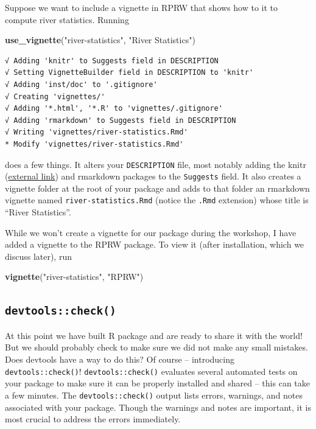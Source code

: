\documentclass[
]{book}
\newenvironment{Shaded}{\begin{snugshade}}{\end{snugshade}}
\newcommand{\KeywordTok}[1]{\textcolor[rgb]{0.13,0.29,0.53}{\textbf{#1}}}
\newcommand{\NormalTok}[1]{#1}
\newcommand{\StringTok}[1]{\textcolor[rgb]{0.31,0.60,0.02}{#1}}
\begin{document}
Suppose we want to include a vignette in RPRW that shows how to it to compute river statistics. Running

\begin{Shaded}
\begin{Highlighting}[]
\KeywordTok{use_vignette}\NormalTok{(}\StringTok{"river-statistics"}\NormalTok{, }\StringTok{"River Statistics"}\NormalTok{)}
\end{Highlighting}
\end{Shaded}

\begin{verbatim}
√ Adding 'knitr' to Suggests field in DESCRIPTION
√ Setting VignetteBuilder field in DESCRIPTION to 'knitr'
√ Adding 'inst/doc' to '.gitignore'
√ Creating 'vignettes/'
√ Adding '*.html', '*.R' to 'vignettes/.gitignore'
√ Adding 'rmarkdown' to Suggests field in DESCRIPTION
√ Writing 'vignettes/river-statistics.Rmd'
* Modify 'vignettes/river-statistics.Rmd'
\end{verbatim}

does a few things. It alters your \texttt{DESCRIPTION} file, most notably adding the knitr (\href{https://yihui.org/knitr/}{external link}) and rmarkdown packages to the \texttt{Suggests} field. It also creates a vignette folder at the root of your package and adds to that folder an rmarkdown vignette named \texttt{river-statistics.Rmd} (notice the \texttt{.Rmd} extension) whose title is ``River Statistics''.

While we won't create a vignette for our package during the workshop, I have added a vignette to the RPRW package. To view it (after installation, which we discuss later), run

\begin{Shaded}
\begin{Highlighting}[]
\KeywordTok{vignette}\NormalTok{(}\StringTok{"river-statistics"}\NormalTok{, }\StringTok{"RPRW"}\NormalTok{)}
\end{Highlighting}
\end{Shaded}

\hypertarget{check}{%
\subsection{\texorpdfstring{\texttt{devtools::check()}}{devtools::check()}}\label{check}}

At this point we have built R package and are ready to share it with the world! But we should probably check to make sure we did not make any small mistakes. Does devtools have a way to do this? Of course -- introducing \texttt{devtools::check()}! \texttt{devtools::check()} evaluates several automated tests on your package to make sure it can be properly installed and shared -- this can take a few minutes. The \texttt{devtools::check()} output lists errors, warnings, and notes associated with your package. Though the warnings and notes are important, it is most crucial to address the errors immediately.
\end{document}
